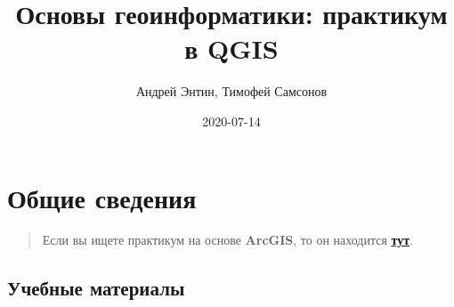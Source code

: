 \documentclass[
  12pt,
]{book}
\title{Основы геоинформатики: практикум в QGIS}
\author{Андрей Энтин, Тимофей Самсонов}
\date{2020-07-14}
\begin{document}
\maketitle

{
\hypersetup{linkcolor=}
\setcounter{tocdepth}{1}
\tableofcontents
}
\hypertarget{ux43eux431ux449ux438ux435-ux441ux432ux435ux434ux435ux43dux438ux44f}{%
\chapter*{Общие сведения}\label{ux43eux431ux449ux438ux435-ux441ux432ux435ux434ux435ux43dux438ux44f}}

\begin{quote}
Если вы ищете практикум на основе \textbf{ArcGIS}, то он находится \href{https://tsamsonov.github.io/arcgis-course/}{\textbf{тут}}.
\end{quote}

\hypertarget{ux443ux447ux435ux431ux43dux44bux435-ux43cux430ux442ux435ux440ux438ux430ux43bux44b}{%
\section*{Учебные материалы}\label{ux443ux447ux435ux431ux43dux44bux435-ux43cux430ux442ux435ux440ux438ux430ux43bux44b}}
\end{document}
